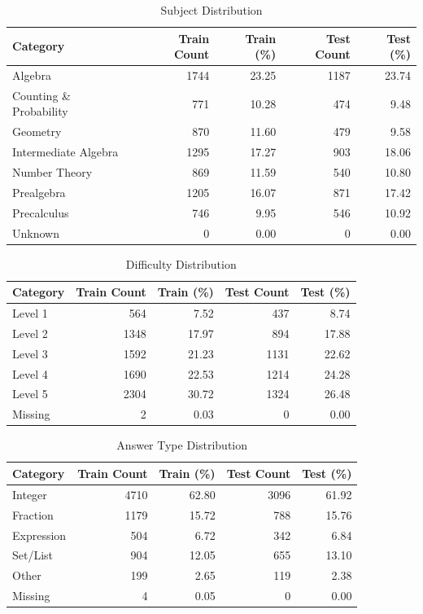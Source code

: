 \begin{table}[ht]
\centering
\caption{Subject Distribution}
\begin{tabular}{lrrrr}
\hline
Category & Train Count & Train (\%) & Test Count & Test (\%)\\
\hline
Algebra & 1744 & 23.25 & 1187 & 23.74\\
Counting \& Probability & 771 & 10.28 & 474 & 9.48\\
Geometry & 870 & 11.60 & 479 & 9.58\\
Intermediate Algebra & 1295 & 17.27 & 903 & 18.06\\
Number Theory & 869 & 11.59 & 540 & 10.80\\
Prealgebra & 1205 & 16.07 & 871 & 17.42\\
Precalculus & 746 & 9.95 & 546 & 10.92\\
Unknown & 0 & 0.00 & 0 & 0.00\\
\hline
\end{tabular}
\end{table}

\begin{table}[ht]
\centering
\caption{Difficulty Distribution}
\begin{tabular}{lrrrr}
\hline
Category & Train Count & Train (\%) & Test Count & Test (\%)\\
\hline
Level 1 & 564 & 7.52 & 437 & 8.74\\
Level 2 & 1348 & 17.97 & 894 & 17.88\\
Level 3 & 1592 & 21.23 & 1131 & 22.62\\
Level 4 & 1690 & 22.53 & 1214 & 24.28\\
Level 5 & 2304 & 30.72 & 1324 & 26.48\\
Missing & 2 & 0.03 & 0 & 0.00\\
\hline
\end{tabular}
\end{table}

\begin{table}[ht]
\centering
\caption{Answer Type Distribution}
\begin{tabular}{lrrrr}
\hline
Category & Train Count & Train (\%) & Test Count & Test (\%)\\
\hline
Integer & 4710 & 62.80 & 3096 & 61.92\\
Fraction & 1179 & 15.72 & 788 & 15.76\\
Expression & 504 & 6.72 & 342 & 6.84\\
Set/List & 904 & 12.05 & 655 & 13.10\\
Other & 199 & 2.65 & 119 & 2.38\\
Missing & 4 & 0.05 & 0 & 0.00\\
\hline
\end{tabular}
\end{table}
